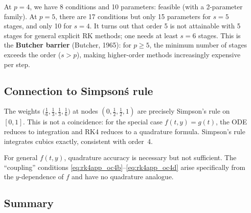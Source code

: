 \documentclass[12pt,a4paper]{article}
\theoremstyle{definition}
\theoremstyle{plain}
\theoremstyle{remark}
\begin{document}
At $p=4$, we have 8 conditions and 10 parameters: feasible (with a 2-parameter family). At $p=5$, there are 17 conditions but only 15 parameters for $s = 5$ stages, and only 10 for $s = 4$. It turns out that order 5 is not attainable with 5 stages for general explicit RK methods; one needs at least $s = 6$ stages. This is the \textbf{Butcher barrier} (Butcher, 1965): for $p \geq 5$, the minimum number of stages exceeds the order ($s > p$), making higher-order methods increasingly expensive per step.

\subsection{Connection to Simpson\'s rule}

The weights $\big(\tfrac{1}{6}, \tfrac{1}{3}, \tfrac{1}{3}, \tfrac{1}{6}\big)$ at nodes $(0, \tfrac{1}{2}, \tfrac{1}{2}, 1)$ are precisely Simpson's rule on $[0,1]$. This is not a coincidence: for the special case $f(t,y) = g(t)$, the ODE reduces to integration and RK4 reduces to a quadrature formula. Simpson's rule integrates cubics exactly, consistent with order~4.

For general $f(t,y)$, quadrature accuracy is necessary but not sufficient. The ``coupling'' conditions \eqref{eq:rk4app_oc4b}--\eqref{eq:rk4app_oc4d} arise specifically from the $y$-dependence of $f$ and have no quadrature analogue.

\subsection{Summary}
\end{document}
